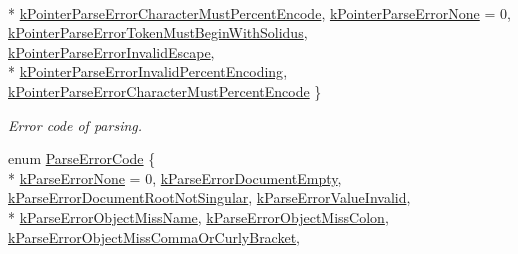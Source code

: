 \begin{DoxyCompactItemize}
\\*
\hyperlink{group___r_a_p_i_d_j_s_o_n___e_r_r_o_r_s_ggacb2e274f33e54d91b96e9883a99a98beabd7eae93627f74267009a03679b6dc38}{k\+Pointer\+Parse\+Error\+Character\+Must\+Percent\+Encode}, 
\hyperlink{group___r_a_p_i_d_j_s_o_n___e_r_r_o_r_s_ggacb2e274f33e54d91b96e9883a99a98bea81e2b6fbd1bf4ac890ddb7779265e3a0}{k\+Pointer\+Parse\+Error\+None} = 0, 
\hyperlink{group___r_a_p_i_d_j_s_o_n___e_r_r_o_r_s_ggacb2e274f33e54d91b96e9883a99a98bea5821696a2ab6cbccdc8288cbe6e81c77}{k\+Pointer\+Parse\+Error\+Token\+Must\+Begin\+With\+Solidus}, 
\hyperlink{group___r_a_p_i_d_j_s_o_n___e_r_r_o_r_s_ggacb2e274f33e54d91b96e9883a99a98bea4d2a7e511d717fd1d2f532ef5fcf821b}{k\+Pointer\+Parse\+Error\+Invalid\+Escape}, 
\\*
\hyperlink{group___r_a_p_i_d_j_s_o_n___e_r_r_o_r_s_ggacb2e274f33e54d91b96e9883a99a98beac0c1b013c0db34dcc5a47fc1ee7a8c35}{k\+Pointer\+Parse\+Error\+Invalid\+Percent\+Encoding}, 
\hyperlink{group___r_a_p_i_d_j_s_o_n___e_r_r_o_r_s_ggacb2e274f33e54d91b96e9883a99a98beabd7eae93627f74267009a03679b6dc38}{k\+Pointer\+Parse\+Error\+Character\+Must\+Percent\+Encode}
 \}\begin{DoxyCompactList}\small\item\em Error code of parsing. \end{DoxyCompactList}
\item 
enum \hyperlink{group___r_a_p_i_d_j_s_o_n___e_r_r_o_r_s_ga8d4b32dfc45840bca189ade2bbcb6ba7}{Parse\+Error\+Code} \{ \\*
\hyperlink{group___r_a_p_i_d_j_s_o_n___e_r_r_o_r_s_gga8d4b32dfc45840bca189ade2bbcb6ba7ac0856bac4945cbd1d09e9502fd8f852f}{k\+Parse\+Error\+None} = 0, 
\hyperlink{group___r_a_p_i_d_j_s_o_n___e_r_r_o_r_s_gga8d4b32dfc45840bca189ade2bbcb6ba7a04b368d184e84b50580be2faa55f738a}{k\+Parse\+Error\+Document\+Empty}, 
\hyperlink{group___r_a_p_i_d_j_s_o_n___e_r_r_o_r_s_gga8d4b32dfc45840bca189ade2bbcb6ba7a2293b39033220f4c2a568482c497dab5}{k\+Parse\+Error\+Document\+Root\+Not\+Singular}, 
\hyperlink{group___r_a_p_i_d_j_s_o_n___e_r_r_o_r_s_gga8d4b32dfc45840bca189ade2bbcb6ba7a20a50e257aab726699ab02192db72ba9}{k\+Parse\+Error\+Value\+Invalid}, 
\\*
\hyperlink{group___r_a_p_i_d_j_s_o_n___e_r_r_o_r_s_gga8d4b32dfc45840bca189ade2bbcb6ba7ae3142fbadf2c4cdfd0c7200d7b6b8ed3}{k\+Parse\+Error\+Object\+Miss\+Name}, 
\hyperlink{group___r_a_p_i_d_j_s_o_n___e_r_r_o_r_s_gga8d4b32dfc45840bca189ade2bbcb6ba7a55cda7eb30436986ab42a61e06caf017}{k\+Parse\+Error\+Object\+Miss\+Colon}, 
\hyperlink{group___r_a_p_i_d_j_s_o_n___e_r_r_o_r_s_gga8d4b32dfc45840bca189ade2bbcb6ba7a34f70d7ed2fa121954f5fc5b5113d05f}{k\+Parse\+Error\+Object\+Miss\+Comma\+Or\+Curly\+Bracket}, 

\end{DoxyCompactItemize}
